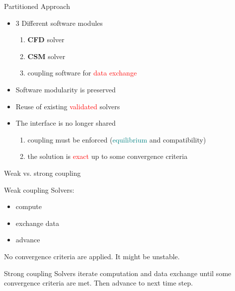 \documentclass[10pt,t]{beamer}
\begin{document}
\begin{frame}{Partitioned Approach}
    \begin{itemize}
        \item  3 Different software modules
            \begin{enumerate}
                \itemsep 5pt
                \item \textbf{CFD} solver
                \item \textbf{CSM} solver
                \item coupling software for \textcolor{red}{data exchange}
            \end{enumerate}
        \vspace{5mm}
        \pause
        \item Software modularity is preserved
        \item Reuse of existing \textcolor{red}{validated} solvers
        
        \vspace{5mm}
        \pause
        
        \item The interface is no longer shared
        
        \begin{enumerate}
            \itemsep 5pt
            \item coupling must be enforced (\textcolor{teal}{equilibrium} and \textcolor{pblue}{compatibility})
            \item the solution is \textcolor{red}{exact} up to some convergence criteria
        \end{enumerate}
    \end{itemize}
\end{frame}


\begin{frame}{Weak vs. strong coupling}

\begin{block}{Weak coupling}
Solvers:
\begin{itemize}
    \item \textcolor{dblue}{compute}
    \item \textcolor{fgreen}{exchange data}
    \item \textcolor{dorange}{advance} 
\end{itemize}
No convergence criteria are applied. It might be unstable.
\end{block}

\pause

\vspace{5mm}
\begin{exampleblock}{Strong coupling}
Solvers iterate \textcolor{dblue}{computation} and \textcolor{fgreen}{data exchange} until some convergence criteria are met. Then \textcolor{dorange}{advance} to next time step.
\end{exampleblock}
\label{coupling}
\hyperlink{couplingdetails}{}

\end{frame}
\end{document}
